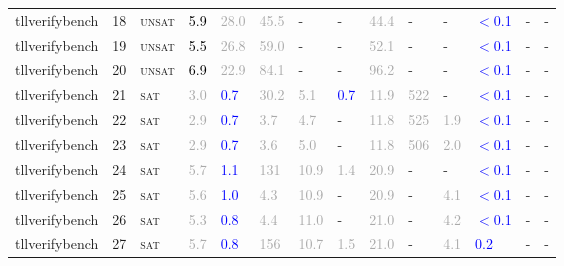 \begin{center}
{\begin{longtable}{@{}llllllllllllll@{}}
tllverifybench & 18 & \textsc{unsat} & \textcolor{black}{5.9} & \textcolor{darkgray}{28.0} & \textcolor{darkgray}{45.5} & - & - & \textcolor{darkgray}{44.4} & - & - & \textcolor{blue}{$<$0.1} & - & - \\
tllverifybench & 19 & \textsc{unsat} & \textcolor{black}{5.5} & \textcolor{darkgray}{26.8} & \textcolor{darkgray}{59.0} & - & - & \textcolor{darkgray}{52.1} & - & - & \textcolor{blue}{$<$0.1} & - & - \\
tllverifybench & 20 & \textsc{unsat} & \textcolor{black}{6.9} & \textcolor{darkgray}{22.9} & \textcolor{darkgray}{84.1} & - & - & \textcolor{darkgray}{96.2} & - & - & \textcolor{blue}{$<$0.1} & - & - \\
tllverifybench & 21 & \textsc{sat} & \textcolor{darkgray}{3.0} & \textcolor{blue}{0.7} & \textcolor{darkgray}{30.2} & \textcolor{darkgray}{5.1} & \textcolor{blue}{0.7} & \textcolor{darkgray}{11.9} & \textcolor{darkgray}{522} & - & \textcolor{blue}{$<$0.1} & - & - \\
tllverifybench & 22 & \textsc{sat} & \textcolor{darkgray}{2.9} & \textcolor{blue}{0.7} & \textcolor{darkgray}{3.7} & \textcolor{darkgray}{4.7} & - & \textcolor{darkgray}{11.8} & \textcolor{darkgray}{525} & \textcolor{darkgray}{1.9} & \textcolor{blue}{$<$0.1} & - & - \\
tllverifybench & 23 & \textsc{sat} & \textcolor{darkgray}{2.9} & \textcolor{blue}{0.7} & \textcolor{darkgray}{3.6} & \textcolor{darkgray}{5.0} & - & \textcolor{darkgray}{11.8} & \textcolor{darkgray}{506} & \textcolor{darkgray}{2.0} & \textcolor{blue}{$<$0.1} & - & - \\
tllverifybench & 24 & \textsc{sat} & \textcolor{darkgray}{5.7} & \textcolor{blue}{1.1} & \textcolor{darkgray}{131} & \textcolor{darkgray}{10.9} & \textcolor{darkgray}{1.4} & \textcolor{darkgray}{20.9} & - & - & \textcolor{blue}{$<$0.1} & - & - \\
tllverifybench & 25 & \textsc{sat} & \textcolor{darkgray}{5.6} & \textcolor{blue}{1.0} & \textcolor{darkgray}{4.3} & \textcolor{darkgray}{10.9} & - & \textcolor{darkgray}{20.9} & - & \textcolor{darkgray}{4.1} & \textcolor{blue}{$<$0.1} & - & - \\
tllverifybench & 26 & \textsc{sat} & \textcolor{darkgray}{5.3} & \textcolor{blue}{0.8} & \textcolor{darkgray}{4.4} & \textcolor{darkgray}{11.0} & - & \textcolor{darkgray}{21.0} & - & \textcolor{darkgray}{4.2} & \textcolor{blue}{$<$0.1} & - & - \\
tllverifybench & 27 & \textsc{sat} & \textcolor{darkgray}{5.7} & \textcolor{blue}{0.8} & \textcolor{darkgray}{156} & \textcolor{darkgray}{10.7} & \textcolor{darkgray}{1.5} & \textcolor{darkgray}{21.0} & - & \textcolor{darkgray}{4.1} & \textcolor{blue}{0.2} & - & - \\

\end{longtable}}
\end{center}
